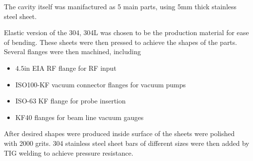 \documentclass{book}
\begin{document}
The cavity itself was manifactured as 5 main parts, using 5mm thick stainless steel sheet. 

Elastic version of the 304, 304L was chosen to be the production material for ease of bending.
These sheets were then pressed to achieve the shapes of the parts. 
Several flanges were then machined, including
\begin{itemize}
    \item $4.5$in EIA RF flange for RF input
    \item ISO100-KF vacuum connector flanges for vacuum pumps
    \item ISO-63 KF flange for probe insertion
    \item KF40 flanges for beam line vacuum gauges
\end{itemize}
After desired shapes were produced inside surface of the sheets were polished with 2000 grits. 
304 stainless steel sheet bars of different sizes were then added by 
TIG welding to achieve pressure resistance.
\end{document}
